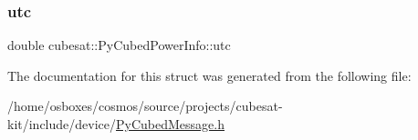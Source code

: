 \mbox{\label{structcubesat_1_1PyCubedPowerInfo_a996ed40659fdb6b6839be93c41916823}} 
\subsubsection{\texorpdfstring{utc}{utc}}
{\footnotesize\ttfamily double cubesat\+::\+Py\+Cubed\+Power\+Info\+::utc}



The documentation for this struct was generated from the following file\+:\begin{DoxyCompactItemize}
\item 
/home/osboxes/cosmos/source/projects/cubesat-\/kit/include/device/\hyperlink{PyCubedMessage_8h}{Py\+Cubed\+Message.\+h}\end{DoxyCompactItemize}
